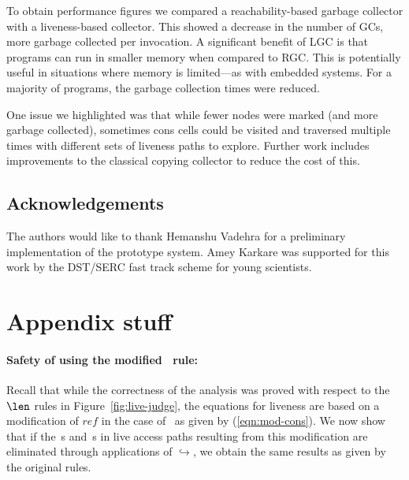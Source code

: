 To obtain performance figures we compared a reachability-based garbage
collector with a liveness-based  collector.  This showed a decrease in
the  number  of  GCs,   more  garbage  collected  per  invocation.   A
significant benefit of LGC is  that programs can run in smaller memory
when compared to  RGC. This is potentially useful  in situations where
memory  is  limited---as with  embedded  systems.  For  a majority  of
programs, the garbage collection times were reduced.

One issue we  highlighted was that while fewer  nodes were marked (and
more garbage collected), sometimes  cons cells could be visited and
traversed  multiple times  with different  sets of  liveness  paths to
explore.  Further work includes  improvements to the classical copying
collector to reduce the cost of this.



\subsection*{Acknowledgements}
The authors  would like  to thank Hemanshu  Vadehra for  a preliminary
implementation of the prototype system. Amey Karkare was supported for
this work by the DST/SERC fast track scheme for young scientists.  







\appendix
\section{Appendix stuff}

\paragraph{Safety of using the modified \CONS\  rule:}
Recall that while the correctness of the analysis was proved with
respect to  the $\len$ rules  in Figure~\ref{fig:live-judge}, the
equations   for  liveness   are  based   on  a   modification  of
$\mathit{ref}$    in    the    case    of   \CONS\  as  given    by
(\ref{eqn:mod-cons}).  We now show that  if the \bcar\,s and \bcdr\,s
in live access  paths resulting  from this  modification are
eliminated through  applications of $\hookrightarrow$,  we obtain
the same results as given by the original rules.


